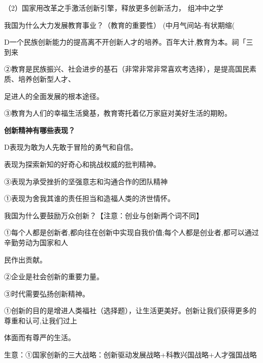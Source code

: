 \documentclass[lang=cn,11pt]{elegantbook}
\newcommand{\daofasym}[1]{{\daofasymbolfont #1}}
\newcommand{\daofasym}[1]{#1}
\begin{document}
（2）国家用改革之手激活创新引擎，释放更多创新活力， 组冲中之学\par

我国为什么大力发展教育事业？（教育的重要性） (中月气间站-有状期缩(\par

D一个民族创新能力的提高离不开创新人才的培养。百年大计,教育为本。祠「三 到来\par

\daofasym{②}教育是民族振兴、社会进步的基石（非常非常非常喜欢考选择），是提高国民素质、培养创新型人才、\par

足进人的全面发展的根本途径。\par

\daofasym{③}教育为人们的幸福生活奠基，教育寄托着亿万家庭对美好生活的期盼。\par

\textbf{创新精神有哪些表现？}\par

D表现为敢为人先敢于冒险的勇气和自信。\par

表现为探索新知的好奇心和挑战权威的批判精神。\par

\daofasym{③}表现为承受挫折的坚强意志和沟通合作的团队精神\par

\daofasym{①}表现为舍我其谁的责任担当和造福人类的济世情怀。\par

我国为什么要鼓励万众创新？【注意：创业与创新两个词不同】\par

\daofasym{①}每个人都是创新者,都向往在创新中实现自我价值;每个人都是创业者,都可以通过辛勤劳动为国家和人\par

民作出贡献。\par

\daofasym{②}企业是社会创新的重要力量。\par

\daofasym{③}时代需要弘扬创新精神。\par

\daofasym{①}创新的目的是增进人类福社（选择题），让生活更美好。创新让我们获得更多的尊重和认可,让我们过上\par

体面而有尊严的生活。\par

生意：\daofasym{①}国家创新的三大战略：创新驱动发展战略+科教兴国战略+人才强国战略\par
\end{document}
